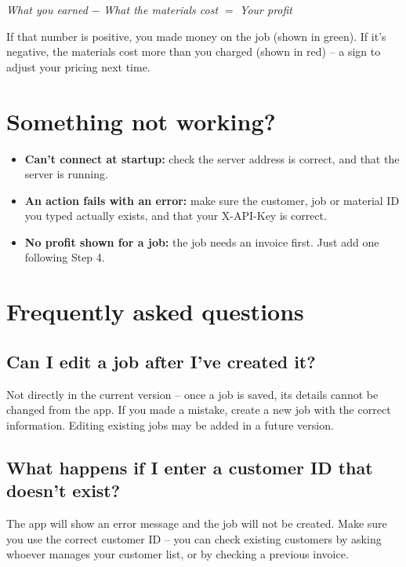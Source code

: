 \documentclass[11pt,a4paper]{article}
\begin{document}
\begin{center}
\textit{What you earned} $-$ \textit{What the materials cost} $=$ \textit{Your profit}
\end{center}

If that number is positive, you made money on the job (shown in green). If it's negative, the materials cost more than you charged (shown in red) -- a sign to adjust your pricing next time.

\section{Something not working?}

\begin{itemize}
  \item \textbf{Can't connect at startup:} check the server address is correct, and that the server is running.
  \item \textbf{An action fails with an error:} make sure the customer, job or material ID you typed actually exists, and that your X-API-Key is correct.
  \item \textbf{No profit shown for a job:} the job needs an invoice first. Just add one following Step 4.
\end{itemize}

\section{Frequently asked questions}

\subsection*{Can I edit a job after I've created it?}

Not directly in the current version -- once a job is saved, its details cannot be changed from the app. If you made a mistake, create a new job with the correct information. Editing existing jobs may be added in a future version.

\subsection*{What happens if I enter a customer ID that doesn't exist?}

The app will show an error message and the job will not be created. Make sure you use the correct customer ID -- you can check existing customers by asking whoever manages your customer list, or by checking a previous invoice.
\end{document}
